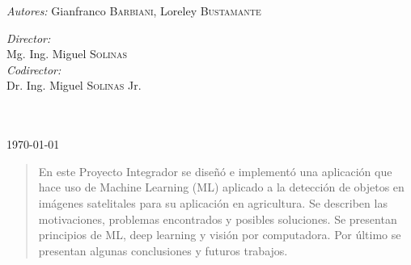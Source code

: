 \documentclass[runningheads]{llncs}
\begin{document}
\begin{titlepage}
\begin{center}
 
\begin{minipage}[t]{0.4\textwidth}
\begin{flushleft} \large
\emph{Autores: }{Gianfranco \textsc{Barbiani}, Loreley \textsc{Bustamante}}\\ %
\end{flushleft}
\end{minipage}
\begin{minipage}[t]{0.4\textwidth}
\begin{flushright} \large
\emph{Director:}\\{Mg. Ing. Miguel \textsc{Solinas}} \\
\emph{Codirector:}\\{Dr. Ing. Miguel \textsc{Solinas} Jr.}
\\~\\~\\ %
\end{flushright}
\end{minipage}

{\large \today}\\ %
\vfill
\end{center}
\end{titlepage}
\clearpage %
\pagebreak

\begin{abstract}
En este Proyecto Integrador se diseñó e implementó una aplicación que hace uso de Machine Learning (ML) aplicado a la detección de objetos en imágenes satelitales para su aplicación en agricultura. Se describen las motivaciones, problemas encontrados y posibles soluciones. Se presentan principios de ML, deep learning y visión por computadora. Por último se presentan algunas conclusiones y futuros trabajos.
\end{abstract}
\newpage
\end{document}
